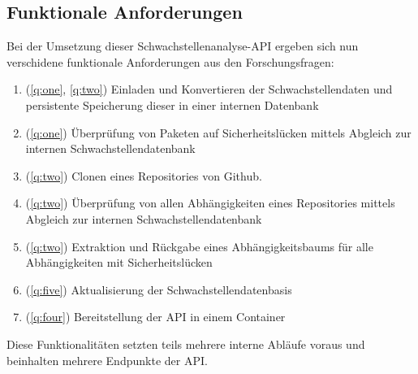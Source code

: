 \subsection{Funktionale Anforderungen} \label{sec:Funktionale_Anforderungen}
    Bei der Umsetzung dieser Schwachstellenanalyse-\ac{API} ergeben sich nun verschidene funktionale Anforderungen aus den Forschungsfragen:
    \begin{enumerate}[label=\textbf{FRQ-\Roman*}, leftmargin=1cm]
        \item (\ref{q:one}, \ref{q:two}) Einladen und Konvertieren der Schwachstellendaten und persistente Speicherung dieser in einer internen Datenbank \label{f:one}
        \item (\ref{q:one}) Überprüfung von Paketen auf Sicherheitslücken mittels Abgleich zur internen Schwachstellendatenbank \label{f:two}
        \item (\ref{q:two}) Clonen eines Repositories von Github. \label{f:three}
        \item (\ref{q:two}) Überprüfung von allen Abhängigkeiten eines Repositories mittels Abgleich zur internen Schwachstellendatenbank \label{f:four}
        \item (\ref{q:two}) Extraktion und Rückgabe eines Abhängigkeitsbaums für alle Abhängigkeiten mit Sicherheits\-lücken \label{f:five}
        \item (\ref{q:five}) Aktualisierung der Schwachstellendatenbasis \label{f:six}
        \item (\ref{q:four}) Bereitstellung der \ac{API} in einem Container \label{f:seven}
    \end{enumerate}
    Diese Funktionalitäten setzten teils mehrere interne Abläufe voraus und beinhalten mehrere Endpunkte der \ac{API}.
